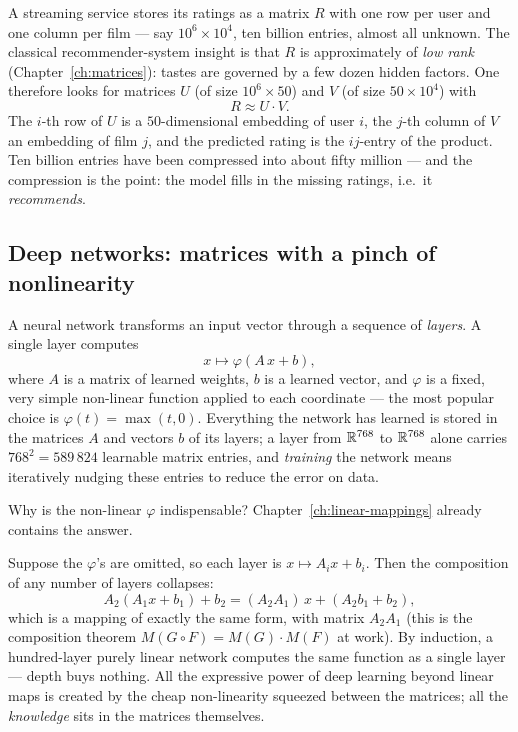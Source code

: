 \begin{example}
A streaming service stores its ratings as a matrix $R$ with one row per user and one column per film —
say $10^6\times 10^4$, ten billion entries, almost all unknown. The classical recommender-system insight
is that $R$ is approximately of \emph{low rank} (Chapter~\ref{ch:matrices}): tastes are governed by a few
dozen hidden factors. One therefore looks for matrices $U$ (of size $10^6\times 50$) and $V$ (of size
$50\times 10^4$) with
\[
R \approx U\cdot V.
\]
The $i$-th row of $U$ is a $50$-dimensional embedding of user $i$, the $j$-th column of $V$ an embedding
of film $j$, and the predicted rating is the $ij$-entry of the product. Ten billion entries have been
compressed into about fifty million — and the compression is the point: the model fills in the missing
ratings, i.e.\ it \emph{recommends}.
\end{example}

\subsection{Deep networks: matrices with a pinch of nonlinearity}

A neural network transforms an input vector through a sequence of \emph{layers}. A single layer computes
\[
x \longmapsto \varphi(A\,x + b),
\]
where $A$ is a matrix of learned weights, $b$ is a learned vector, and $\varphi$ is a fixed, very simple
non-linear function applied to each coordinate — the most popular choice is $\varphi(t) = \max(t, 0)$.
Everything the network has learned is stored in the matrices $A$ and vectors $b$ of its layers; a layer
from $\mathbb{R}^{768}$ to $\mathbb{R}^{768}$ alone carries $768^2 = 589\,824$ learnable matrix entries, and \emph{training}
the network means iteratively nudging these entries to reduce the error on data.

Why is the non-linear $\varphi$ indispensable? Chapter~\ref{ch:linear-mappings} already contains the
answer.

\begin{observation}
Suppose the $\varphi$'s are omitted, so each layer is $x\mapsto A_i x + b_i$. Then the composition of any
number of layers collapses:
\[
A_2(A_1 x + b_1) + b_2 = (A_2 A_1)\, x + (A_2 b_1 + b_2),
\]
which is a mapping of exactly the same form, with matrix $A_2 A_1$
(this is the composition theorem $M(G\circ F) = M(G)\cdot M(F)$ at work). By induction, a
hundred-layer purely linear network computes the same function as a single layer — depth buys nothing.
All the expressive power of deep learning beyond linear maps is created by the cheap non-linearity
squeezed between the matrices; all the \emph{knowledge} sits in the matrices themselves.
\end{observation}

